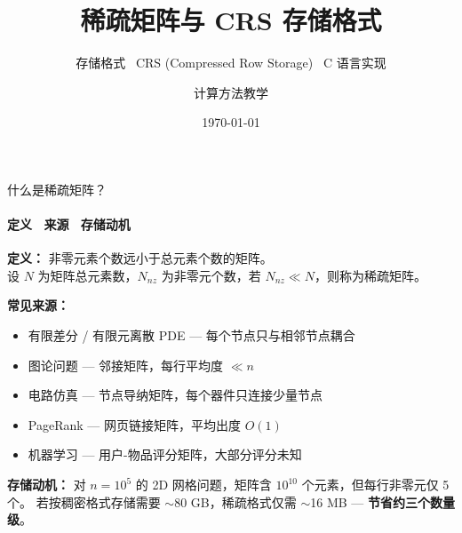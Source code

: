 \documentclass[12pt,aspectratio=169]{beamer}
\title{稀疏矩阵与 CRS 存储格式}
\subtitle{存储格式 \textperiodcentered\ CRS (Compressed Row Storage) \textperiodcentered\ C 语言实现}
\author{计算方法教学}
\date{\today}
\begin{document}
\begin{frame}
\titlepage
\end{frame}

\begin{frame}{什么是稀疏矩阵？}
\framesubtitle{定义 \textperiodcentered\ 来源 \textperiodcentered\ 存储动机}

\textbf{定义：} 非零元素个数远小于总元素个数的矩阵。\\
设 $N$ 为矩阵总元素数，$N_{\!nz}$ 为非零元个数，若 $N_{\!nz} \ll N$，则称为稀疏矩阵。

\vspace{8pt}
\textbf{常见来源：}
\begin{itemize}
  \item 有限差分 / 有限元离散 PDE — 每个节点只与相邻节点耦合
  \item 图论问题 — 邻接矩阵，每行平均度 $\ll n$
  \item 电路仿真 — 节点导纳矩阵，每个器件只连接少量节点
  \item PageRank — 网页链接矩阵，平均出度 $O(1)$
  \item 机器学习 — 用户-物品评分矩阵，大部分评分未知
\end{itemize}

\vspace{8pt}
\pause
\textbf{存储动机：} 对 $n=10^5$ 的 2D 网格问题，矩阵含 $10^{10}$ 个元素，但每行非零元仅 5 个。
若按稠密格式存储需要 $\sim$80 GB，稀疏格式仅需 $\sim$16 MB — \textbf{节省约三个数量级}。
\end{frame}
\end{document}
